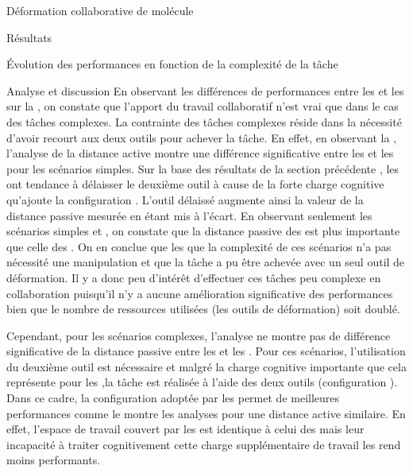 \documentclass[myfrancais]{mythesis}
\begin{document}
\begin{mychapter}{Déformation collaborative de molécule}
\begin{mysection}{Résultats}
\begin{mysubsection}{Évolution des performances en fonction de la complexité de la tâche}
\begin{mysubsubsection}{Analyse et discussion}
					En observant les différences de performances entre les  et les  sur la , on constate que l'apport du travail collaboratif n'est vrai que dans le cas des tâches complexes.
					La contrainte des tâches complexes réside dans la nécessité d'avoir recourt aux deux outils pour achever la tâche.
					En effet, en observant la , l'analyse de la distance active montre une différence significative entre les  et les  pour les scénarios simples.
					Sur la base des résultats de la section précédente , les  ont tendance à délaisser le deuxième outil à cause de la forte charge cognitive qu'ajoute la configuration .
					L'outil délaissé augmente ainsi la valeur de la distance passive mesurée en étant mis à l'écart.
					En observant seulement les scénarios simples  et , on constate que la distance passive des  est plus importante que celle des .
					On en conclue que les  que la complexité de ces scénarios n'a pas nécessité une manipulation  et que la tâche a pu être achevée avec un seul outil de déformation.
					Il y a donc peu d'intérêt d'effectuer ces tâches peu complexe en collaboration puisqu'il n'y a aucune amélioration significative des performances bien que le nombre de ressources utilisées (les outils de déformation) soit doublé.

					Cependant, pour les scénarios complexes, l'analyse ne montre pas de différence significative de la distance passive entre les  et les .
					Pour ces scénarios, l'utilisation du deuxième outil est nécessaire et malgré la charge cognitive importante que cela représente pour les ,la tâche est réalisée à l'aide des deux outils (configuration ).
					Dans ce cadre, la configuration  adoptée par les  permet de meilleures performances comme le montre les analyses pour une distance active similaire.
					En effet, l'espace de travail couvert par les  est identique à celui des  mais leur incapacité à traiter cognitivement cette charge supplémentaire de travail les rend moins performants.


\end{mysubsubsection}
\end{mysubsection}
\end{mysection}
\end{mychapter}
\end{document}

